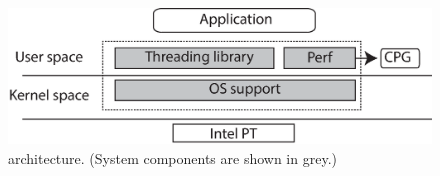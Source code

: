 
\begin{figure}[t]

\centering
      \includegraphics[scale=.4]{figure/System-basic-architecture}
  \caption{\projecttitle architecture. (System components are shown in grey.)}
   
  \label{fig:basicSystem}

\end{figure}

